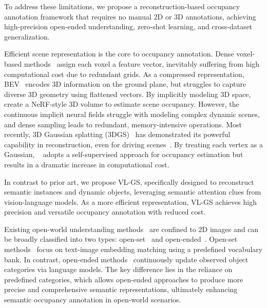 To address these limitations, we propose a reconstruction-based occupancy annotation framework that requires no manual 2D or 3D annotations, achieving high-precision open-ended understanding, zero-shot learning, and cross-dataset generalization.

\vspace{1mm}
Efficient scene representation is the core to occupancy annotation.
%
Dense voxel-based methods~\cite{li2022unifying, chen2023voxelnext, li2022voxel, cao2022monoscene} assign each voxel a feature vector, inevitably suffering from high computational cost due to redundant grids. 
%
As a compressed representation, BEV~\cite{harley2023simple, man2023bev, chambon2024pointbev, li2024fast} encodes 3D information on the ground plane, but struggles to capture diverse 3D geometry using flattened vectors.
%
By implicitly modeling 3D space, ~\cite{zhang2023occnerf, huang2024selfocc, gan2024comprehensive, pan2024renderocc} create a NeRF-style 3D volume to estimate scene occupancy. 
However, the continuous implicit neural fields struggle with modeling complex dynamic scenes, and dense sampling leads to redundant, memory-intensive operations.
%
Most recently, 3D Gaussian splatting (3DGS)~\cite{kerbl20233d, yu2024mip, qin2024langsplat} has demonstrated its powerful capability in reconstruction, even for driving scenes~\cite{zhou2024drivinggaussian, tian2024drivingforward, fischer2024dynamic}. 
%
By treating each vertex as a Gaussian, ~\cite{wan2024gaussianocc} adopts a self-supervised approach for occupancy estimation but results in a dramatic increase in computational cost.

In contrast to prior art, we propose VL-GS, specifically designed to reconstruct semantic instances and dynamic objects, leveraging semantic attention clues from vision-language models. As a more efficient representation, VL-GS achieves high precision and versatile occupancy annotation with reduced cost.

\label{open}
Existing open-world understanding methods~\cite{wu2024towards} are confined to 2D images and can be broadly classified into two types: open-set~\cite{scheirer2012toward} and open-ended~\cite{lin2024generative}. Open-set methods~\cite{li2022grounded, liu2024grounding, cheng2024yolo} focus on text-image embedding matching using a predefined vocabulary bank. In contrast, open-ended methods~\cite{lin2024training, lin2024training} continuously update observed object categories via language models. The key difference lies in the reliance on predefined categories, which allows open-ended approaches to produce more precise and comprehensive semantic representations, ultimately enhancing semantic occupancy annotation in open-world scenarios.

